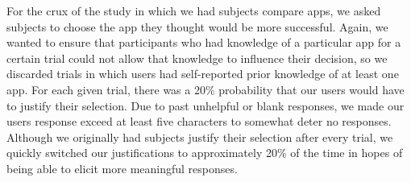For the crux of the study in which we had subjects compare apps, we asked subjects to choose the app they thought would be more successful.  Again, we wanted to ensure that participants who had knowledge of a particular app for a certain trial could not allow that knowledge to influence their decision, so we discarded trials in which users had self-reported prior knowledge of at least one app. For each given trial, there was a 20\% probability that our users would have to justify their selection. Due to past unhelpful or blank responses, we made our users response exceed at least five characters to somewhat deter no responses. Although we originally had subjects justify their selection after every trial, we quickly switched our justifications to approximately 20\% of the time in hopes of being able to elicit more meaningful responses.\\
